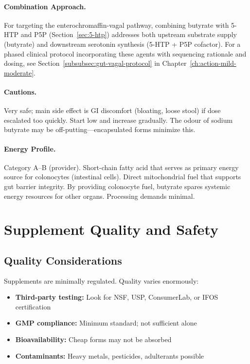 \paragraph{Combination Approach.} For targeting the enterochromaffin-vagal pathway, combining butyrate with 5-HTP and P5P (Section~\ref{sec:5-htp}) addresses both upstream substrate supply (butyrate) and downstream serotonin synthesis (5-HTP + P5P cofactor). For a phased clinical protocol incorporating these agents with sequencing rationale and dosing, see Section~\ref{subsubsec:gut-vagal-protocol} in Chapter~\ref{ch:action-mild-moderate}.

\paragraph{Cautions.} Very safe; main side effect is GI discomfort (bloating, loose stool) if dose escalated too quickly. Start low and increase gradually. The odour of sodium butyrate may be off-putting---encapsulated forms minimize this.

\paragraph{Energy Profile.}
Category A--B (provider). Short-chain fatty acid that serves as primary energy source for colonocytes (intestinal cells). Direct mitochondrial fuel that supports gut barrier integrity. By providing colonocyte fuel, butyrate spares systemic energy resources for other organs. Processing demands minimal.

\section{Supplement Quality and Safety}
\label{sec:supplement-quality}

\subsection{Quality Considerations}

Supplements are minimally regulated. Quality varies enormously:
\begin{itemize}
    \item \textbf{Third-party testing:} Look for NSF, USP, ConsumerLab, or IFOS certification
    \item \textbf{GMP compliance:} Minimum standard; not sufficient alone
    \item \textbf{Bioavailability:} Cheap forms may not be absorbed
    \item \textbf{Contaminants:} Heavy metals, pesticides, adulterants possible
\end{itemize}

